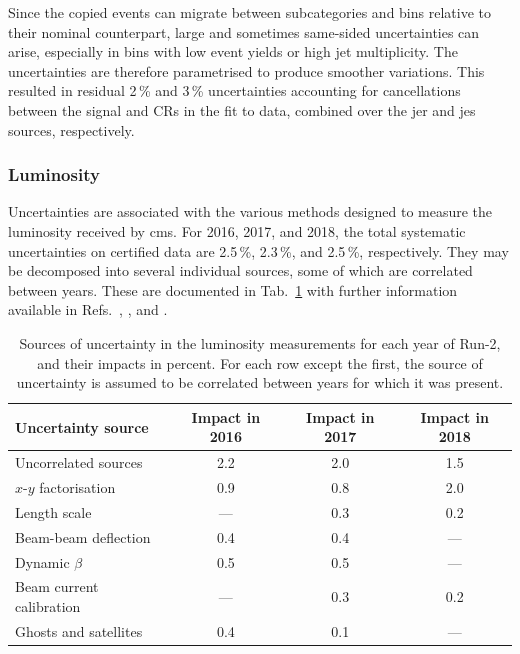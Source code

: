 Since the copied events can migrate between subcategories and \ptmiss bins relative to their nominal counterpart, large and sometimes same-sided uncertainties can arise, especially in bins with low event yields or high \gls{jet} multiplicity. The uncertainties are therefore parametrised to produce smoother variations. This resulted in residual 2\,\% and 3\,\% uncertainties accounting for cancellations between the signal and \glspl{CR} in the fit to data, combined over the \acrshort{jer} and \acrshort{jes} sources, respectively.




\subsubsection{Luminosity}
\label{subsubsec:htoinv_lumi_syst}

Uncertainties are associated with the various methods designed to measure the luminosity received by \acrshort{cms}. For 2016, 2017, and 2018, the total systematic uncertainties on certified data are 2.5\,\%, 2.3\,\%, and 2.5\,\%, respectively. They may be decomposed into several individual sources, some of which are correlated between years. These are documented in Tab.~\ref{tab:lumi_systs} with further information available in Refs.~, , and .

\begin{table}[htbp]
    \centering
    \begin{tabular}{lccc}
        \hline
        Uncertainty source & Impact in 2016 & Impact in 2017 & Impact in 2018 \\\hline
        Uncorrelated sources & 2.2 & 2.0 & 1.5 \\
        $x$-$y$ factorisation & 0.9 & 0.8 & 2.0 \\
        Length scale & --- & 0.3 & 0.2 \\
        Beam-beam deflection & 0.4 & 0.4 & --- \\
        Dynamic $\beta$ & 0.5 & 0.5 & --- \\
        Beam current calibration & --- & 0.3 & 0.2 \\
        Ghosts and satellites & 0.4 & 0.1 & ---  \\\hline
    \end{tabular}
    \caption[Sources of uncertainty in the luminosity measurements for each year of Run-2]{Sources of uncertainty in the luminosity measurements for each year of Run-2, and their impacts in percent. For each row except the first, the source of uncertainty is assumed to be correlated between years for which it was present.}
    \label{tab:lumi_systs}
\end{table}

